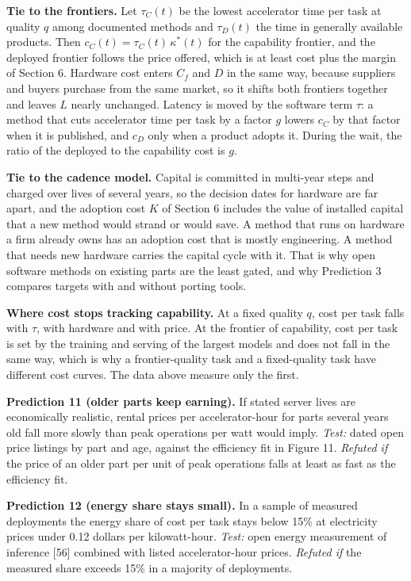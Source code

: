 \documentclass[10pt,letterpaper]{article}
\begin{document}
\textbf{Tie to the frontiers.} Let \(\tau_C(t)\) be the lowest
accelerator time per task at quality \(q\) among documented methods and
\(\tau_D(t)\) the time in generally available products. Then
\(c_C(t) = \tau_C(t)\,\kappa^*(t)\) for the capability frontier, and the
deployed frontier follows the price offered, which is at least cost plus
the margin of Section 6. Hardware cost enters \(C_f\) and \(D\) in the
same way, because suppliers and buyers purchase from the same market, so
it shifts both frontiers together and leaves \(L\) nearly unchanged.
Latency is moved by the software term \(\tau\): a method that cuts
accelerator time per task by a factor \(g\) lowers \(c_C\) by that
factor when it is published, and \(c_D\) only when a product adopts it.
During the wait, the ratio of the deployed to the capability cost is
\(g\).

\textbf{Tie to the cadence model.} Capital is committed in multi-year
steps and charged over lives of several years, so the decision dates for
hardware are far apart, and the adoption cost \(K\) of Section 6
includes the value of installed capital that a new method would strand
or would save. A method that runs on hardware a firm already owns has an
adoption cost that is mostly engineering. A method that needs new
hardware carries the capital cycle with it. That is why open software
methods on existing parts are the least gated, and why Prediction 3
compares targets with and without porting tools.

\textbf{Where cost stops tracking capability.} At a fixed quality \(q\),
cost per task falls with \(\tau\), with hardware and with price. At the
frontier of capability, cost per task is set by the training and serving
of the largest models and does not fall in the same way, which is why a
frontier-quality task and a fixed-quality task have different cost
curves. The data above measure only the first.

\textbf{Prediction 11 (older parts keep earning).} If stated server
lives are economically realistic, rental prices per accelerator-hour for
parts several years old fall more slowly than peak operations per watt
would imply. \emph{Test:} dated open price listings by part and age,
against the efficiency fit in Figure 11. \emph{Refuted if} the price of
an older part per unit of peak operations falls at least as fast as the
efficiency fit.

\textbf{Prediction 12 (energy share stays small).} In a sample of
measured deployments the energy share of cost per task stays below 15\%
at electricity prices under 0.12 dollars per kilowatt-hour. \emph{Test:}
open energy measurement of inference {[}56{]} combined with listed
accelerator-hour prices. \emph{Refuted if} the measured share exceeds
15\% in a majority of deployments.
\end{document}

